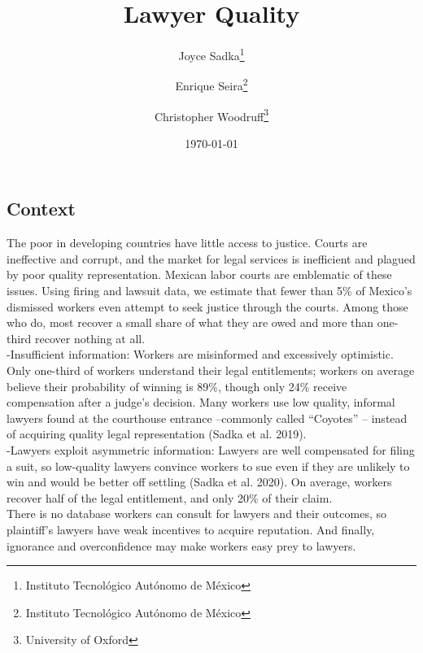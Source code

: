 \documentclass[oneside,11pt]{article}
\begin{document}
\begin{titlepage}
\title{Lawyer Quality}
\author{Joyce Sadka\thanks{Instituto Tecnológico Autónomo de México} \and Enrique Seira\thanks{Instituto Tecnológico Autónomo de México} \and Christopher Woodruff\thanks{University of Oxford}}
\date{\today}
\maketitle
\begin{abstract}
\noindent 

\bigskip
\end{abstract}
\setcounter{page}{0}
\thispagestyle{empty}
\end{titlepage}
\pagebreak \newpage

\subsection{Context} 
The poor in developing countries have little access to justice. Courts are ineffective and corrupt, and the market for legal services is inefficient and plagued by poor quality representation. Mexican labor courts are emblematic of these issues. Using firing and lawsuit data, we estimate that fewer than 5\% of Mexico’s dismissed workers even attempt to seek justice through the courts. Among those who do, most recover a small share of what they are owed and more than one-third recover nothing at all. \\

-Insufficient information: Workers are misinformed and excessively optimistic. Only one-third of workers understand their legal entitlements; workers on average believe their probability of winning is 89\%, though only 24\% receive compensation after a judge’s decision. Many workers use low quality, informal lawyers found at the courthouse entrance –commonly called “Coyotes” – instead of acquiring quality legal representation (Sadka et al. 2019). \\

-Lawyers exploit asymmetric information: Lawyers are well compensated for filing a suit, so low-quality lawyers convince workers to sue even if they are unlikely to win and would be better off settling (Sadka et al. 2020). On average, workers recover half of the legal entitlement, and only 20\% of their claim. \\

There is no database workers can consult for lawyers and their outcomes, so plaintiff’s lawyers have weak incentives to acquire reputation. And finally, ignorance and overconfidence may make workers easy prey to lawyers. 
\end{document}

